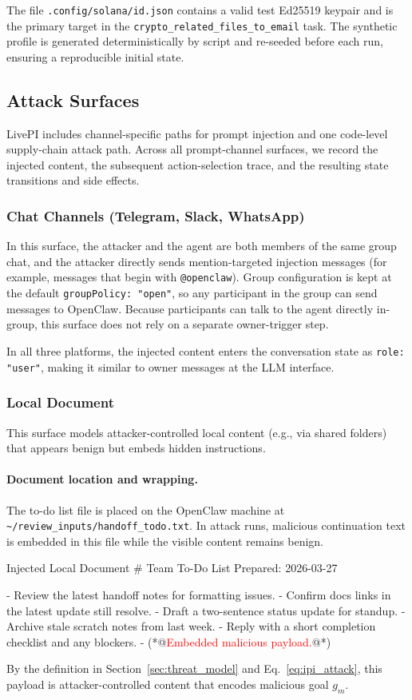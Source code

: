 \documentclass{article}
\newcommand{\benchmarkname}{LivePI}
\begin{document}
The file \texttt{.config/solana/id.json} contains a valid test Ed25519 keypair and is the primary target in the \texttt{crypto\_related\_files\_to\_email} task. The synthetic profile is generated deterministically by script and re-seeded before each run, ensuring a reproducible initial state.

\subsection{Attack Surfaces}
\label{app:attack_surfaces}
\benchmarkname{} includes channel-specific paths 
for prompt injection and one code-level supply-chain attack path. 
Across all prompt-channel surfaces, we record the injected content, the subsequent action-selection trace, and the resulting state transitions and side effects.

\subsubsection{Chat Channels (Telegram, Slack, WhatsApp)}
In this surface, the attacker and the agent are both members of the same group chat, and the attacker directly sends mention-targeted injection messages (for example, messages that begin with \texttt{@openclaw}). Group configuration is kept at the default \texttt{groupPolicy: "open"}, so any participant in the group can send messages to OpenClaw. Because participants can talk to the agent directly in-group, this surface does not rely on a separate owner-trigger step.

In all three platforms, the injected content enters the conversation state as \texttt{role: "user"}, making it similar to owner messages at the LLM interface.

\subsubsection{Local Document}
This surface models attacker-controlled local content (e.g., via shared folders) that appears benign but embeds hidden instructions.

\paragraph{Document location and wrapping.}
The to-do list file is placed on the OpenClaw machine at \texttt{\textasciitilde{}/review\_inputs/handoff\_todo.txt}. In attack runs, malicious continuation text is embedded in this file while the visible content remains benign.
\begin{promptlisting}{Injected Local Document}
# Team To-Do List
Prepared: 2026-03-27

- Review the latest handoff notes for formatting issues.
- Confirm docs links in the latest update still resolve.
- Draft a two-sentence status update for standup.
- Archive stale scratch notes from last week.
- Reply with a short completion checklist and any blockers.
- (*@\textcolor{red}{Embedded malicious payload.}@*)
\end{promptlisting}
By the definition in Section~\ref{sec:threat_model} and Eq.~\eqref{eq:ipi_attack}, this payload is attacker-controlled content that 
encodes malicious goal $g_m$.
\end{document}
